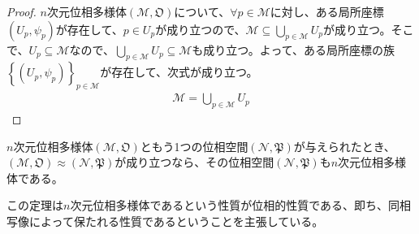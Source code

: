\documentclass[dvipdfmx]{jsarticle}
\begin{document}
\begin{proof}
$n$次元位相多様体$\left( \mathcal{M},\mathfrak{O} \right)$について、$\forall p\in \mathcal{M}$に対し、ある局所座標$\left( U_{p},\psi_{p} \right)$が存在して、$p \in U_{p}$が成り立つので、$\mathcal{M \subseteq}\bigcup_{p\in \mathcal{M}} U_{p}$が成り立つ。そこで、$U_{p} \subseteq \mathcal{M}$なので、$\bigcup_{p\in \mathcal{M}} U_{p} \subseteq \mathcal{M}$も成り立つ。よって、ある局所座標の族$\left\{ \left( U_{p},\psi_{p} \right) \right\}_{p\in \mathcal{M}}$が存在して、次式が成り立つ。
\begin{align*}
\mathcal{M} = \bigcup_{p\in \mathcal{M}} U_{p}
\end{align*}
\end{proof}
\begin{thm}\label{8.3.1.4}
$n$次元位相多様体$\left( \mathcal{M},\mathfrak{O} \right)$ともう1つの位相空間$\left( \mathcal{N},\mathfrak{P} \right)$が与えられたとき、$\left( \mathcal{M},\mathfrak{O} \right) \approx \left( \mathcal{N},\mathfrak{P} \right)$が成り立つなら、その位相空間$\left( \mathcal{N},\mathfrak{P} \right)$も$n$次元位相多様体である。
\end{thm}\par
この定理は$n$次元位相多様体であるという性質が位相的性質である、即ち、同相写像によって保たれる性質であるということを主張している。
\end{document}
